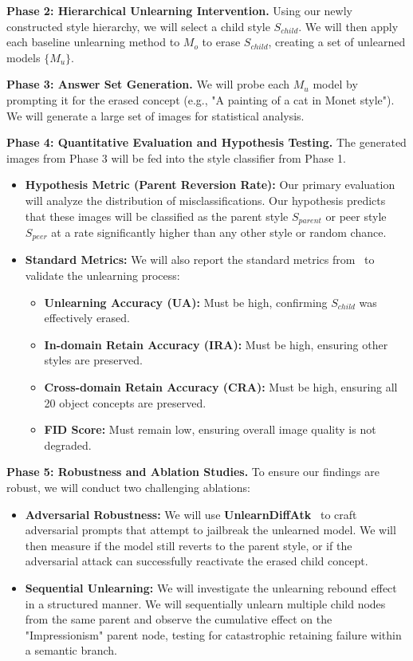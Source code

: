 \noindent \textbf{Phase 2: Hierarchical Unlearning Intervention.}
Using our newly constructed style hierarchy, we will select a child style $S_{child}$. We will then apply each baseline unlearning method to $M_o$ to erase $S_{child}$, creating a set of unlearned models $\{M_{u}\}$.

\noindent \textbf{Phase 3: Answer Set Generation.}
We will probe each $M_{u}$ model by prompting it for the erased concept (e.g., "A painting of a cat in Monet style"). We will generate a large set of images for statistical analysis.

\noindent \textbf{Phase 4: Quantitative Evaluation and Hypothesis Testing.}
The generated images from Phase 3 will be fed into the style classifier from Phase 1.
\begin{itemize}
    \item \textbf{Hypothesis Metric (Parent Reversion Rate):} Our primary evaluation will analyze the distribution of misclassifications. Our hypothesis predicts that these images will be classified as the parent style $S_{parent}$ or peer style $S_{peer}$ at a rate significantly higher than any other style or random chance.
    \item \textbf{Standard Metrics:} We will also report the standard metrics from~\cite{zhang2024unlearncanvas} to validate the unlearning process:
        \begin{itemize}
            \item \textbf{Unlearning Accuracy (UA):} Must be high, confirming $S_{child}$ was effectively erased.
            \item \textbf{In-domain Retain Accuracy (IRA):} Must be high, ensuring other styles are preserved.
            \item \textbf{Cross-domain Retain Accuracy (CRA):} Must be high, ensuring all 20 object concepts are preserved.
            \item \textbf{FID Score:} Must remain low, ensuring overall image quality is not degraded.
        \end{itemize}
\end{itemize}

\noindent \textbf{Phase 5: Robustness and Ablation Studies.}
To ensure our findings are robust, we will conduct two challenging ablations:
\begin{itemize}
    \item \textbf{Adversarial Robustness:} We will use \textbf{UnlearnDiffAtk}~\cite{zhang2024generate} to craft adversarial prompts that attempt to jailbreak the unlearned model. We will then measure if the model still reverts to the parent style, or if the adversarial attack can successfully reactivate the erased child concept.
    \item \textbf{Sequential Unlearning:} We will investigate the unlearning rebound effect~\cite{zhang2024unlearncanvas} in a structured manner. We will sequentially unlearn multiple child nodes from the same parent and observe the cumulative effect on the "Impressionism" parent node, testing for catastrophic retaining failure within a semantic branch.
\end{itemize}

